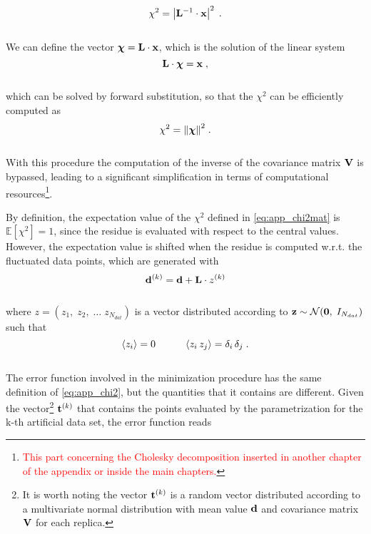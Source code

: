 \documentclass[../main.tex]{subfiles}
\begin{document}
\\
\begin{equation}
    \chi^2 = \left| \mathbf{L}^{-1} \cdot \mathbf{x} \right|^2 \; .
\end{equation}
\\
We can define the vector $\boldsymbol{\chi} = \mathbf{L} \cdot \mathbf{x}$, which is the solution of the linear system
\\
\begin{equation}
    \mathbf{L} \cdot \boldsymbol{\chi} = \mathbf{x} \; ,
\end{equation}
\\
which can be solved by forward substitution, so that the $\chi^2$ can be efficiently computed as
\\
\begin{equation}
    \chi^2 = \norm{\boldsymbol{\chi}}^2 \; . 
\end{equation}
\\
With this procedure the computation of the inverse of the covariance matrix $\mathbf{V}$ is bypassed, leading to a significant simplification in terms of computational resources\footnote{\footnotesize{\textcolor{red}{This part concerning the Cholesky decomposition inserted in another chapter of the appendix or inside the main chapters.}}}.\par
By definition, the expectation value of the $\chi^2$ defined in \eqref{eq:app_chi2mat} is $\mathbb{E}[\chi^2] = 1$, since the residue is evaluated with respect to the central values. However, the expectation value is shifted when the residue is computed w.r.t. the fluctuated data points, which are generated with 
\\
\begin{equation}
    \mathbf{d}^{(k)} = \mathbf{d} + \mathbf{L} \cdot z^{(k)} 
\end{equation}
\\
where $z = (z_1, \; z_2, \; \dots \; z_{N_{dat}})$ is a vector distributed according to $\mathbf{z} \sim \mathcal{N}(\mathbf{0},\; I_{N_{dat}})$ such that
\\
\begin{equation}
    \left< z_i \right> = 0 \hspace{10mm} \left< z_i \, z_j \right> = \delta_i \, \delta_j \;.
\end{equation}
\\
The error function involved in the minimization procedure has the same definition of \eqref{eq:app_chi2}, but the quantities that it contains are different. Given the vector\footnote{\footnotesize{It is worth noting the vector $\mathbf{t}^{(k)}$ is a random vector distributed according to a multivariate normal distribution with mean value $\mathbf{d}$ and covariance matrix $\mathbf{V}$ for each replica.}} $\mathbf{t}^{(k)}$ that contains the points evaluated by the parametrization for the k-th artificial data set, the error function reads
\end{document}
